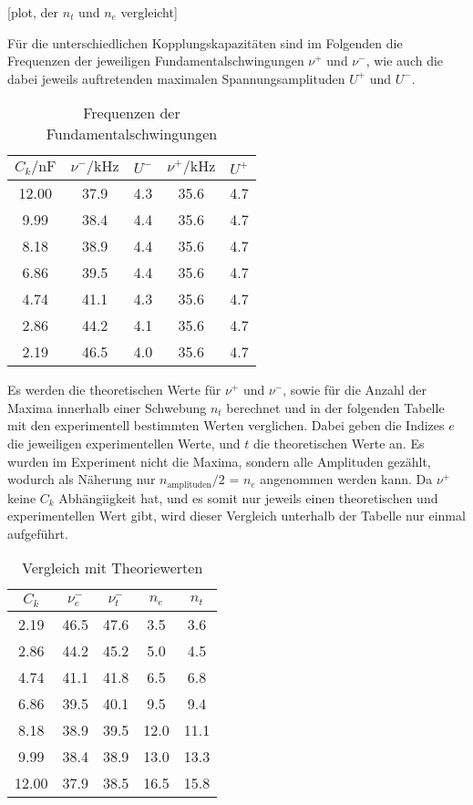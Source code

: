 [plot, der $n_t$ und $n_e$ vergleicht]


Für die unterschiedlichen Kopplungskapazitäten sind im Folgenden die Frequenzen der jeweiligen
Fundamentalschwingungen $\nu^+$ und $\nu^-$, wie auch die dabei jeweils auftretenden maximalen
Spannungsamplituden $U^+$ und $U^-$.

\begin{table}
    \centering
    \caption{Frequenzen der Fundamentalschwingungen}
    \label{tab:b}
    \begin{tabular}{c c c c c}
    \toprule
    {$C_k / \si{\nano\farad}$} & {$\nu^- / \si{\kilo\hertz}$} & {$U^-$} & {$\nu^+ / \si{\kilo\hertz}$} & {$U^+$} \\
    \midrule
    12.00 & 37.9 & 4.3 & 35.6 & 4.7 \\
     9.99 & 38.4 & 4.4 & 35.6 & 4.7 \\
     8.18 & 38.9 & 4.4 & 35.6 & 4.7 \\
     6.86 & 39.5 & 4.4 & 35.6 & 4.7 \\
     4.74 & 41.1 & 4.3 & 35.6 & 4.7 \\
     2.86 & 44.2 & 4.1 & 35.6 & 4.7 \\
     2.19 & 46.5 & 4.0 & 35.6 & 4.7 \\
     \bottomrule
    \end{tabular}
\end{table}

Es werden die theoretischen Werte für $\nu^+$ und $\nu^-$, sowie für die Anzahl der Maxima innerhalb einer Schwebung $n_t$
berechnet und in der folgenden Tabelle mit den experimentell bestimmten Werten verglichen. Dabei geben die Indizes $e$ die jeweiligen
experimentellen Werte, und $t$ die theoretischen Werte an. 
Es wurden im Experiment nicht die Maxima, sondern alle Amplituden gezählt, wodurch als Näherung nur ${n_\text{amplituden}}/2$ = $n_e$
angenommen werden kann.
Da $\nu^+$ keine $C_k$ Abhängiigkeit hat, und es somit nur jeweils einen theoretischen und experimentellen Wert gibt, wird
dieser Vergleich unterhalb der Tabelle nur einmal aufgeführt.

\begin{table}
    \centering
    \caption{Vergleich mit Theoriewerten}
    \label{tab:theo}
    \begin{tabular}{c c c c c}
        \toprule
        $C_k$ & $\nu_e^-$ & $\nu_t^-$ & $n_e$ & $n_t$ \\
        \midrule
         2.19 & 46.5 & 47.6 &  3.5 &  3.6 \\
         2.86 & 44.2 & 45.2 &  5.0 &  4.5 \\
         4.74 & 41.1 & 41.8 &  6.5 &  6.8 \\
         6.86 & 39.5 & 40.1 &  9.5 &  9.4 \\
         8.18 & 38.9 & 39.5 & 12.0 & 11.1 \\
         9.99 & 38.4 & 38.9 & 13.0 & 13.3 \\
        12.00 & 37.9 & 38.5 & 16.5 & 15.8 \\
        \bottomrule
    \end{tabular}
\end{table}



